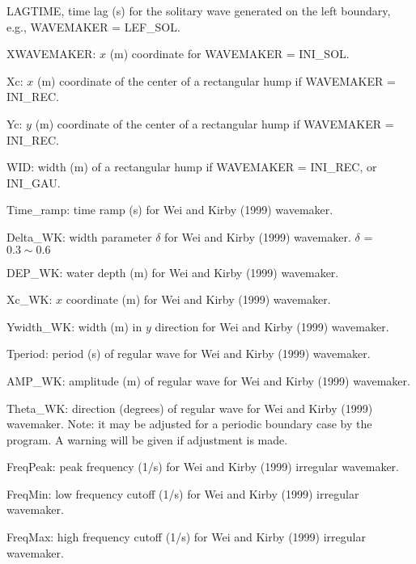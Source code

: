 \documentclass[11pt]{article}
\begin{document}
\begin{description}
\item LAGTIME, time lag (s) for the solitary wave generated on the left boundary, e.g., WAVEMAKER = LEF\_SOL. 
 
\item XWAVEMAKER: $x$  (m) coordinate for WAVEMAKER = INI\_SOL.


\item Xc: $x$ (m) coordinate of the center of  a rectangular hump if WAVEMAKER = INI\_REC.

\item Yc: $y$ (m) coordinate of the center of  a rectangular hump if WAVEMAKER = INI\_REC.

\item WID: width (m) of  a rectangular hump if WAVEMAKER = INI\_REC, or INI\_GAU.


\item Time\_ramp: time ramp (s) for Wei and Kirby (1999) wavemaker. 
 
\item Delta\_WK:  width parameter $\delta$  for Wei and Kirby (1999) wavemaker.    $\delta$ =  $0.3 \sim 0.6$

\item DEP\_WK: water depth (m) for Wei and Kirby (1999) wavemaker.

\item Xc\_WK: $x$ coordinate (m) for Wei and Kirby (1999) wavemaker.

\item Ywidth\_WK: width (m) in $y$ direction for Wei and Kirby (1999) wavemaker.

\item Tperiod:  period (s) of regular wave for Wei and Kirby (1999) wavemaker.

\item AMP\_WK: amplitude (m) of regular wave for Wei and Kirby (1999) wavemaker.

\item Theta\_WK: direction (degrees) of regular wave for Wei and Kirby (1999) wavemaker. Note: it may be adjusted for a periodic boundary case by the program. A warning will be given if adjustment is made. 
 
\item FreqPeak: peak frequency (1/s) for Wei and Kirby (1999) irregular wavemaker.

\item FreqMin: low frequency cutoff (1/s) for Wei and Kirby (1999) irregular wavemaker.
 
\item FreqMax: high frequency cutoff (1/s) for Wei and Kirby (1999) irregular wavemaker.


\end{description}
\end{document}
